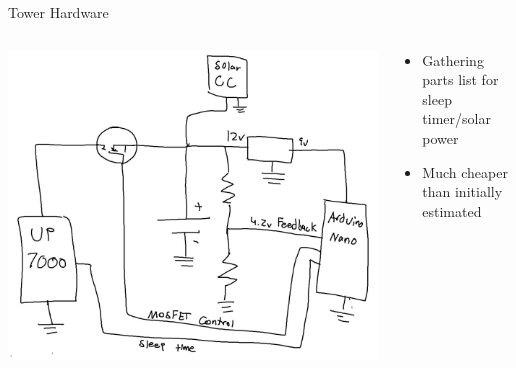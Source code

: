 \begin{frame}{Tower Hardware}
    \begin{columns}
        \begin{column}{0.5\textwidth}
            \centering
            \includegraphics[height=0.7\textheight,width=\textwidth,keepaspectratio]{images/rtt/Screenshot 2024-10-21 013935.jpg}
        \end{column}
        \begin{column}{0.5\textwidth}
            \begin{itemize}
                \item Gathering parts list for sleep timer/solar power
                \item Much cheaper than initially estimated
            \end{itemize}
        \end{column}
    \end{columns}
\end{frame}
